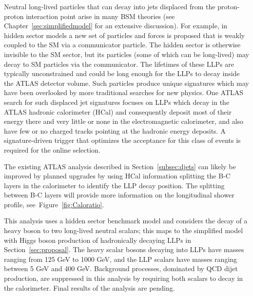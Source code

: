 Neutral long-lived particles that can decay into jets displaced from the proton-proton interaction point arise in many BSM theories (see Chapter~\ref{sec:simplifiedmodel} for an extensive discussion). For example, in hidden sector models a new set of particles and forces is proposed that is weakly coupled to the SM via a communicator particle. The hidden sector is otherwise invisible to the SM sector, but its particles (some of which can be long-lived) may decay to SM particles via the communicator. The lifetimes of these LLPs are typically unconstrained and could be long enough for the LLPs to decay inside the ATLAS detector volume. Such particles produce unique signatures which may have been overlooked by more traditional searches for new physics. One ATLAS search for such displaced jet signatures focuses on LLPs which decay in the ATLAS hadronic calorimeter (HCal) and consequently deposit most of their energy there and very little or none in the electromagnetic calorimeter, and also have few or no charged tracks pointing at the hadronic energy deposits. A signature-driven trigger that optimizes the acceptance for this class of events is required for the online selection.

The existing ATLAS analysis described in Section~\ref{subsec:djets} can likely be improved by planned upgrades by using HCal information splitting the B-C layers in the calorimeter to identify the LLP decay position. %
The splitting between B-C layers will provide more information on the longitudinal shower profile, see~Figure~\ref{fig:Caloratio}.

This analysis uses a hidden sector benchmark model and considers the decay of a heavy boson to two long-lived neutral scalars; this maps to the simplified model with Higgs boson production of hadronically decaying LLPs in Section~\ref{sec:proposal}. The heavy scalar bosons decaying into LLPs have masses ranging from 125 GeV to 1000 GeV, and the LLP scalars have masses ranging between 5 GeV and 400 GeV.
Background processes, dominated by QCD dijet production, are suppressed in this analysis by requiring both scalars to decay  in the calorimeter. Final results of the analysis are pending.

